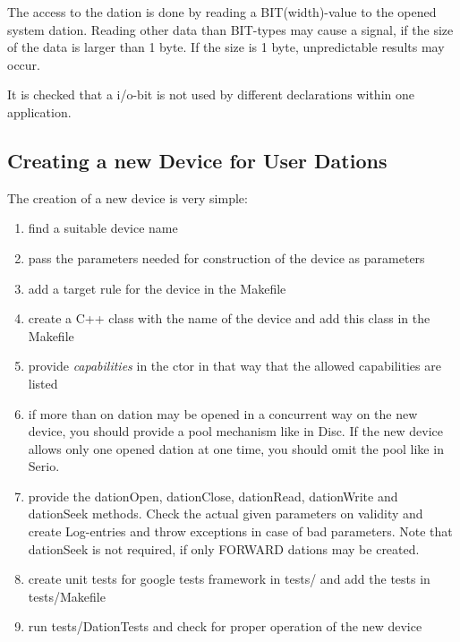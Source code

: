 The access to the dation is done by reading a BIT(width)-value to the
opened system dation. 
Reading other data than BIT-types  may cause a signal, if the size of the
data is larger than 1 byte. If the size is 1 byte, unpredictable results may
occur.

It is checked that a i/o-bit is not used by different declarations within
one application.
  
  
\subsection{Creating a new Device for User Dations}
The creation of a new device is very simple:
\begin{enumerate}
\item find a suitable device name
\item pass the parameters needed for construction of the device as
      parameters
\item add a target rule for the device in the Makefile
\item create a C++ class with the name of the device and add this class
      in the Makefile
\item provide {\em capabilities} in the ctor in that way that the allowed
      capabilities are listed
\item if more than on dation may be opened in a concurrent way on the new
      device, you should provide a pool mechanism like in Disc.
      If the new device allows only one opened dation at one time, you 
      should omit the pool like in Serio.
\item provide the dationOpen, dationClose, dationRead, dationWrite 
      and dationSeek methods. Check the actual given parameters on
      validity and create Log-entries and throw exceptions in case
      of bad parameters.
      Note that dationSeek is not required, if only FORWARD dations
      may be created.
\item create unit tests for google tests framework in tests/ and add the
      tests in tests/Makefile
\item run tests/DationTests and check for proper operation of the new device
\end{enumerate}

